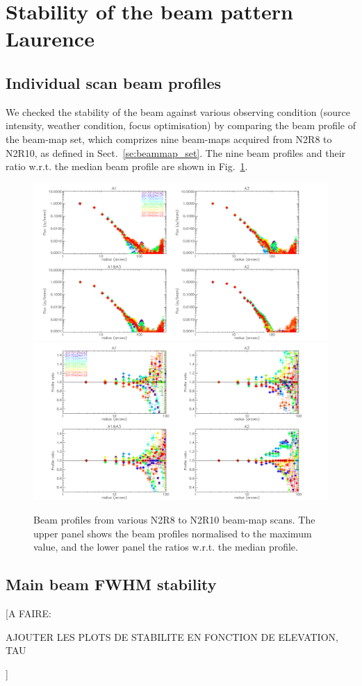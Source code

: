
\section{Stability of the beam pattern {\color{blue} Laurence}}


\subsection{Individual scan beam profiles}

We checked the stability of the beam against various observing
condition (source intensity, weather condition, focus optimisation) by
comparing the beam profile of the beam-map set, which comprizes nine
beam-maps acquired from N2R8 to N2R10, as defined in
Sect.~\ref{se:beammap_set}.
The nine beam profiles and their ratio
w.r.t. the median beam profile are shown in Fig.~\ref{fig:beam_prof}.


\begin{figure}[h]
  \centering
  \includegraphics[clip=true,width=\textwidth]{Figures/Profile_allscans_mixed}
  \includegraphics[clip=true,width=\textwidth]{Figures/Profile_allscans_over_median_mixed}
\caption[Stability of the beam profile]{Beam profiles from various N2R8 to N2R10
  beam-map scans. The upper panel shows the beam profiles normalised
  to the maximum value, and the lower panel the ratios w.r.t. the median profile.}
  \label{fig:beam_prof}
\end{figure}


\subsection{Main beam FWHM stability}

[A FAIRE:

  AJOUTER LES PLOTS DE STABILITE EN FONCTION DE ELEVATION, TAU

]
